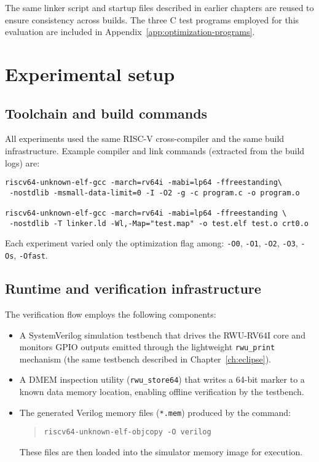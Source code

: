 The same linker script and startup files described in earlier chapters are reused to ensure consistency across builds.  
The three C test programs employed for this evaluation are included in Appendix~\ref{app:optimization-programs}.



\section{Experimental setup}
\label{sec:optim-setup}

\subsection{Toolchain and build commands}
All experiments used the same RISC-V cross-compiler and the same build infrastructure. Example compiler and link commands (extracted from the build logs) are:

\begin{verbatim}
riscv64-unknown-elf-gcc -march=rv64i -mabi=lp64 -ffreestanding\
 -nostdlib -msmall-data-limit=0 -I -O2 -g -c program.c -o program.o

riscv64-unknown-elf-gcc -march=rv64i -mabi=lp64 -ffreestanding \
 -nostdlib -T linker.ld -Wl,-Map="test.map" -o test.elf test.o crt0.o
\end{verbatim}

Each experiment varied only the optimization flag among: \texttt{-O0},  \texttt{-O1}, \texttt{-O2}, \texttt{-O3}, \texttt{-Os}, \texttt{-Ofast}.

\subsection{Runtime and verification infrastructure}
The verification flow employs the following components:
\begin{itemize}
  \item A SystemVerilog simulation testbench that drives the RWU-RV64I core and monitors GPIO outputs emitted through the lightweight \texttt{rwu\_print} mechanism (the same testbench described in Chapter~\ref{ch:eclipse}).
  
  \item A DMEM inspection utility (\texttt{rwu\_store64}) that writes a 64-bit marker to a known data memory location, enabling offline verification by the testbench.
  
  \item The generated Verilog memory files (\texttt{*.mem}) produced by the command:
  \begin{quote}
    \texttt{riscv64-unknown-elf-objcopy -O verilog}
  \end{quote}
  These files are then loaded into the simulator memory image for execution.
\end{itemize}


